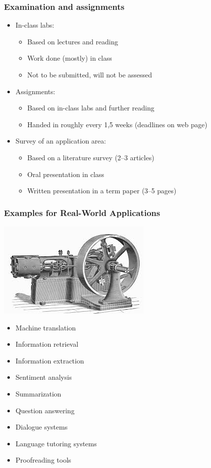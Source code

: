 \documentclass[dvipsnames]{beamer}
\begin{document}
\begin{frame}
\frametitle{Examination and assignments}
\begin{itemize}
\item In-class labs:
  \begin{itemize}
  \item Based on lectures and reading
  \item Work done (mostly) in class
  \item Not to be submitted, will not be assessed
  \end{itemize}
\item<2-> Assignments:
  \begin{itemize}
  \item Based on in-class labs and further reading
  \item Handed in roughly every 1,5 weeks (deadlines on web page)
  \end{itemize}
\item<3-> Survey of an application area:
  \begin{itemize}
  \item Based on a literature survey (2--3 articles)
  \item Oral presentation in class
  \item Written presentation in a term paper (3--5 pages)
  \end{itemize}
\end{itemize}
\end{frame}

\begin{frame}
\frametitle{Examples for Real-World Applications}
\hfill \includegraphics[scale=0.4]{steam}
\begin{itemize}
\vspace{-2.5cm}
\item Machine translation
\item Information retrieval
\item Information extraction
\item Sentiment analysis
\item Summarization
\item Question answering
\item Dialogue systems
\item Language tutoring systems
\item Proofreading tools
\end{itemize}
\end{frame}
\end{document}
